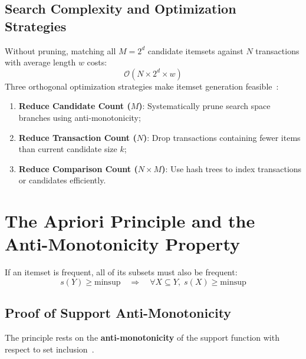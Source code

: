 \subsection{Search Complexity and Optimization Strategies}
Without pruning, matching all $M = 2^d$ candidate itemsets against $N$ transactions with average length $w$ costs:
\begin{equation}
\label{eq:dm-exhaustive-search-complexity-en}
\mathcal{O}\left(N \times 2^d \times w\right)
\end{equation}
Three orthogonal optimization strategies make itemset generation feasible~\cite{tan2018}:
\begin{enumerate}
    \item \textbf{Reduce Candidate Count ($M$)}: Systematically prune search space branches using anti-monotonicity;
    \item \textbf{Reduce Transaction Count ($N$)}: Drop transactions containing fewer items than current candidate size $k$;
    \item \textbf{Reduce Comparison Count ($N \times M$)}: Use hash trees to index transactions or candidates efficiently.
\end{enumerate}

\section[The Apriori Principle and Anti-Monotonicity]{The Apriori Principle and the\\Anti-Monotonicity Property}
\label{sec:dm-apriori-principle}

\begin{theorem}
\label{thm:dm-apriori-principle-en}
If an itemset is frequent, all of its subsets must also be frequent:
\begin{equation}
\label{eq:dm-apriori-forward-en}
s(Y) \ge \mathrm{minsup} \quad \Longrightarrow \quad \forall X \subseteq Y, \; s(X) \ge \mathrm{minsup}
\end{equation}
\end{theorem}

\subsection{Proof of Support Anti-Monotonicity}
The principle rests on the \textbf{anti-monotonicity} of the support function with respect to set inclusion~\cite{tan2018}.

